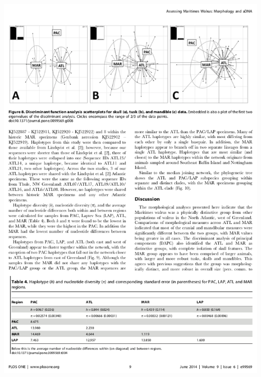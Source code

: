 \documentclass[10pt]{beamer}
\begin{document}
\begin{frame}
\begin{columns}
		\begin{column}{0.5\textwidth}
			\begin{center}
				\includegraphics[width=1.0\textwidth]{figures/paper4.png}
			\end{center}
		\end{column}
	\end{columns}
\end{frame}
\end{document}
